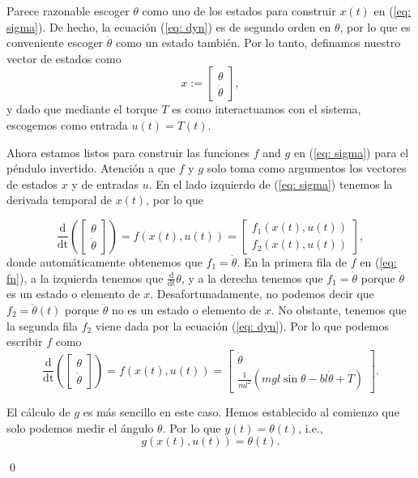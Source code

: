 \begin{example}
Parece razonable escoger $\theta$ como uno de los estados para construir $x(t)$ en (\ref{eq: sigma}). De hecho, la ecuación (\ref{eq: dyn}) es de segundo orden en $\theta$, por lo que es conveniente escoger $\dot\theta$ como un estado también. Por lo tanto, definamos nuestro vector de estados como
\begin{equation}
x := \begin{bmatrix}\theta \\ \dot\theta \end{bmatrix},
\end{equation}
y dado que mediante el torque $T$ es como interactuamos con el sistema, escogemos como entrada $u(t) = T(t)$.

Ahora estamos listos para construir las funciones $f$ and $g$ en (\ref{eq: sigma}) para el péndulo invertido. Atención a que $f$ y $g$ solo toma como argumentos los vectores de estados $x$ y de entradas $u$. En el lado izquierdo de (\ref{eq: sigma}) tenemos la derivada temporal de $x(t)$, por lo que

\begin{equation}
	\frac{\mathrm{d}}{\mathrm{dt}}\left(\begin{bmatrix}\theta \\ \dot\theta \end{bmatrix}\right) = f(x(t), u(t)) = \begin{bmatrix}f_1(x(t), u(t)) \\ f_2(x(t), u(t))\end{bmatrix}, \label{eq: fn}
\end{equation}
donde automáticamente obtenemos que $f_1 = \dot\theta$. En la primera fila de $f$ en (\ref{eq: fn}), a la izquierda tenemos que $\frac{\mathrm{d}}{\mathrm{dt}}\theta$, y a la derecha tenemos que $f_1 = \dot\theta$ porque $\dot\theta$ es un estado o elemento de $x$. Desafortunadamente, no podemos decir que $f_2 = \ddot\theta(t)$ porque $ \ddot\theta$ no es un estado o elemento de $x$. No obstante, tenemos que la segunda fila $f_2$ viene dada por la ecuación (\ref{eq: dyn}). Por lo que podemos escribir $f$ como
\begin{equation}
	\frac{\mathrm{d}}{\mathrm{dt}}\left(\begin{bmatrix}\theta \\ \dot\theta \end{bmatrix}\right) =  f(x(t), u(t)) = \begin{bmatrix} \dot\theta \\ \frac{1}{ml^2}\left(mgl\sin{\theta}-bl\dot\theta + T\right) \end{bmatrix}. \label{eq: f}
\end{equation}

El cálculo de $g$ es más sencillo en este caso. Hemos establecido al comienzo que solo podemos medir el ángulo $\theta$. Por lo que $y(t) = \theta(t)$, i.e.,
\begin{equation}
g(x(t),u(t)) =  \theta(t).
	\label{eq: g}
\end{equation}

\qed 
\end{example}

